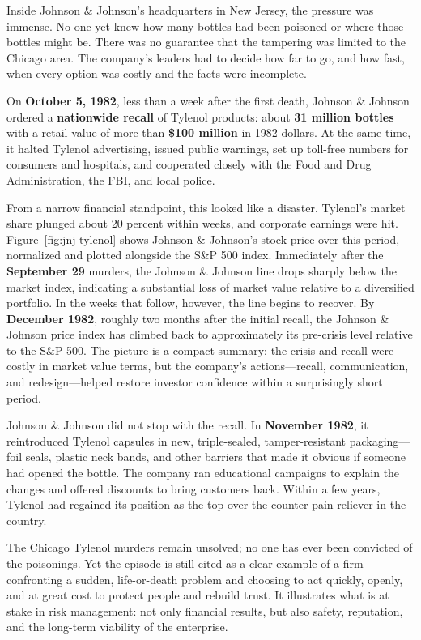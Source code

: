 \documentclass[11pt,openany]{book}
\begin{document}
\begin{corporateexample}
Inside Johnson \& Johnson's headquarters in New Jersey, the pressure was immense. No one yet knew how many bottles had been poisoned or where those bottles might be. There was no guarantee that the tampering was limited to the Chicago area. The company's leaders had to decide how far to go, and how fast, when every option was costly and the facts were incomplete.

On \textbf{October 5, 1982}, less than a week after the first death, Johnson \& Johnson ordered a \textbf{nationwide recall} of Tylenol products: about \textbf{31 million bottles} with a retail value of more than \textbf{\$100 million} in 1982 dollars. At the same time, it halted Tylenol advertising, issued public warnings, set up toll-free numbers for consumers and hospitals, and cooperated closely with the Food and Drug Administration, the FBI, and local police.

From a narrow financial standpoint, this looked like a disaster. Tylenol's market share plunged about 20 percent within weeks, and corporate earnings were hit. Figure~\ref{fig:jnj-tylenol} shows Johnson \& Johnson's stock price over this period, normalized and plotted alongside the S\&P 500 index. Immediately after the \textbf{September 29} murders, the Johnson \& Johnson line drops sharply below the market index, indicating a substantial loss of market value relative to a diversified portfolio. In the weeks that follow, however, the line begins to recover. By \textbf{December 1982}, roughly two months after the initial recall, the Johnson \& Johnson price index has climbed back to approximately its pre-crisis level relative to the S\&P 500. The picture is a compact summary: the crisis and recall were costly in market value terms, but the company's actions---recall, communication, and redesign---helped restore investor confidence within a surprisingly short period.





Johnson \& Johnson did not stop with the recall. In \textbf{November 1982}, it reintroduced Tylenol capsules in new, triple-sealed, tamper-resistant packaging---foil seals, plastic neck bands, and other barriers that made it obvious if someone had opened the bottle. The company ran educational campaigns to explain the changes and offered discounts to bring customers back. Within a few years, Tylenol had regained its position as the top over-the-counter pain reliever in the country.

The Chicago Tylenol murders remain unsolved; no one has ever been convicted of the poisonings. Yet the episode is still cited as a clear example of a firm confronting a sudden, life-or-death problem and choosing to act quickly, openly, and at great cost to protect people and rebuild trust. It illustrates what is at stake in risk management: not only financial results, but also safety, reputation, and the long-term viability of the enterprise.
\end{corporateexample}
\end{document}
